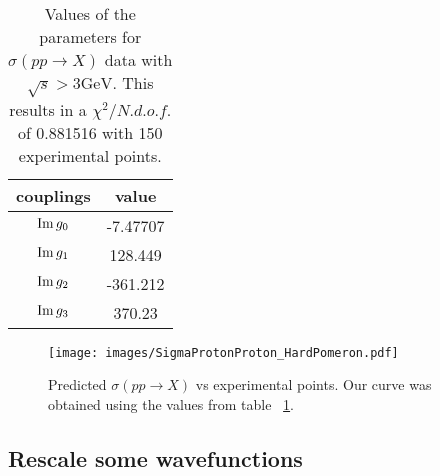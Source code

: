 \documentclass[preprint, 12pt]{elsarticle}
\begin{document}
\begin{table}[b!]
\centering
\caption{Values of the parameters for $\sigma\left(p p \rightarrow X\right)$ data with $ \sqrt{s} > 3 \text{GeV}$. This results in a $\chi^2 / {N.d.o.f.}$ of 0.881516 with 150 experimental points.}
\vspace{0.5cm}
\begin{tabular}{|c|c|}
\hline
couplings   & value \\
\hline
${\rm Im} \, g_0$  & -7.47707\\ 
\hline
${\rm Im} \, g_1$  & 128.449 \\ 
\hline
${\rm Im} \, g_2$  & -361.212  \\
\hline
${\rm Im} \, g_3$  & 370.23 \\ 
\hline
\end{tabular}
\label{table:SigmaPP_best_fit}
\end{table}

\begin{figure}[!h]
\center
\texttt{[image: images/SigmaProtonProton\_HardPomeron.pdf]} 
\caption{Predicted $\sigma\left(p p \rightarrow X\right)$ vs experimental points. Our curve was obtained using the values from table ~\ref{table:SigmaPP_best_fit}.}
\label{fig:SigmaPP_best_fit}
\end{figure}

\subsection{Rescale some wavefunctions}
\end{document}
